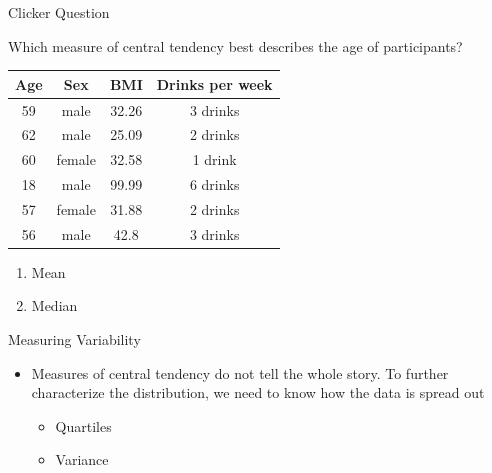 \documentclass{beamer}
\begin{document}
\begin{frame}{Clicker Question}
	\begin{center}
		Which measure of central tendency best describes the age of participants?
		
		\begin{tabular}{ | c | c | c | c |}
			\hline
			\textbf{Age} & \textbf{Sex} & \textbf{BMI} & \textbf{Drinks per week} \\ [0.5ex]
			\hline
			59           & male         & 32.26        & 3 drinks                 \\
			\hline
			62           & male         & 25.09        & 2 drinks                 \\
			\hline
			60           & female       & 32.58        & 1 drink                  \\ 
			\hline
			18           & male         & 99.99        & 6 drinks                 \\ 
			\hline
			57           & female       & 31.88        & 2 drinks                 \\ 
			\hline
			56           & male         & 42.8         & 3 drinks                 \\
			\hline
		\end{tabular}
		\begin{enumerate}[label=(\alph*)]
			\item Mean
			\item Median
		\end{enumerate}
	\end{center}
\end{frame}




\begin{frame}{Measuring Variability}
	
	\begin{itemize}
		\item Measures of central tendency do not tell the whole story. To further characterize the distribution, we need to know how the data is spread out
		      \begin{itemize}
		      	\item Quartiles
		      	\item Variance
		      \end{itemize}
	\end{itemize}
	
\end{frame}
\end{document}
